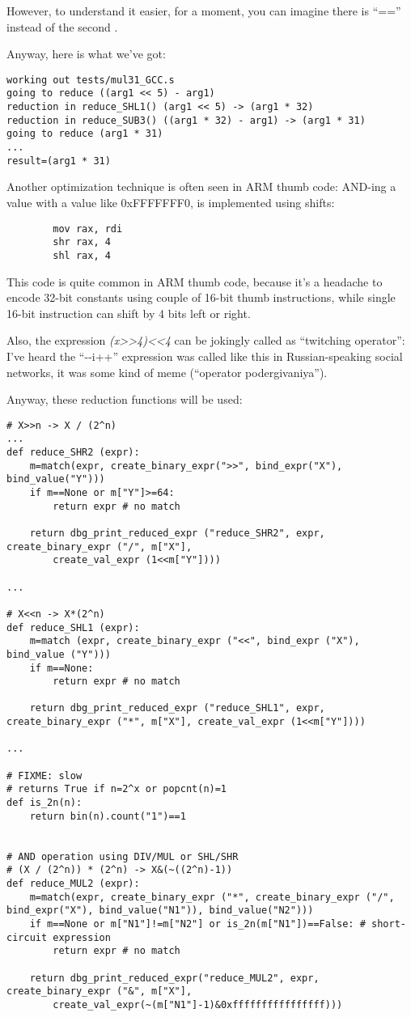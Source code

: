 However, to understand it easier, for a moment, you can imagine there is ``=='' instead of the second .

Anyway, here is what we've got:

\begin{lstlisting}
working out tests/mul31_GCC.s
going to reduce ((arg1 << 5) - arg1)
reduction in reduce_SHL1() (arg1 << 5) -> (arg1 * 32)
reduction in reduce_SUB3() ((arg1 * 32) - arg1) -> (arg1 * 31)
going to reduce (arg1 * 31)
...
result=(arg1 * 31)
\end{lstlisting}

Another optimization technique is often seen in ARM thumb code: AND-ing a value with a value like 0xFFFFFFF0,
is implemented using shifts:

\begin{lstlisting}
        mov rax, rdi
        shr rax, 4
        shl rax, 4
\end{lstlisting}

This code is quite common in ARM thumb code, because it's a headache to encode 32-bit constants using couple of 16-bit
thumb instructions, while single 16-bit instruction can shift by 4 bits left or right.

Also, the expression \textit{(x>>4)<<4} can be jokingly called as ``twitching operator'':
I've heard the ``-{}-i++'' expression was called like this in Russian-speaking social networks, it was some kind of meme
(``operator podergivaniya'').

Anyway, these reduction functions will be used:

\begin{lstlisting}
# X>>n -> X / (2^n)
...
def reduce_SHR2 (expr):
    m=match(expr, create_binary_expr(">>", bind_expr("X"), bind_value("Y")))
    if m==None or m["Y"]>=64:
        return expr # no match

    return dbg_print_reduced_expr ("reduce_SHR2", expr, create_binary_expr ("/", m["X"],
        create_val_expr (1<<m["Y"])))

...

# X<<n -> X*(2^n)
def reduce_SHL1 (expr):
    m=match (expr, create_binary_expr ("<<", bind_expr ("X"), bind_value ("Y")))
    if m==None:
        return expr # no match
    
    return dbg_print_reduced_expr ("reduce_SHL1", expr, create_binary_expr ("*", m["X"], create_val_expr (1<<m["Y"])))

...

# FIXME: slow
# returns True if n=2^x or popcnt(n)=1
def is_2n(n):
    return bin(n).count("1")==1


# AND operation using DIV/MUL or SHL/SHR
# (X / (2^n)) * (2^n) -> X&(~((2^n)-1))
def reduce_MUL2 (expr):
    m=match(expr, create_binary_expr ("*", create_binary_expr ("/", bind_expr("X"), bind_value("N1")), bind_value("N2")))
    if m==None or m["N1"]!=m["N2"] or is_2n(m["N1"])==False: # short-circuit expression
        return expr # no match

    return dbg_print_reduced_expr("reduce_MUL2", expr, create_binary_expr ("&", m["X"],
        create_val_expr(~(m["N1"]-1)&0xffffffffffffffff)))
\end{lstlisting}

